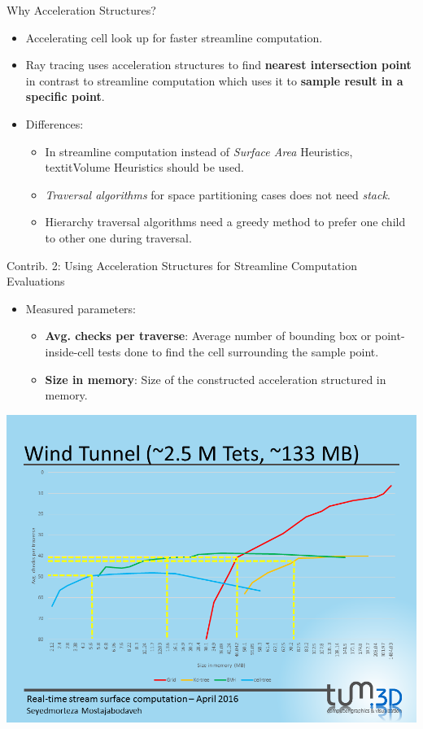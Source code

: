 \documentclass{beamer}
\begin{document}
\begin{frame}{Why Acceleration Structures?}
	\begin{itemize}
		\item Accelerating cell look up for faster streamline computation.
		\item Ray tracing uses acceleration structures to find \textbf{nearest intersection point} in contrast to streamline computation which uses it to \textbf{sample result in a specific point}.
		\item Differences:
		    \begin{itemize}
		    	\item In streamline computation instead of \textit{Surface Area} Heuristics, textit{Volume} Heuristics should be used.
		    	\item \textit{Traversal algorithms} for space partitioning cases does not need \textit{stack}.
		    	\item Hierarchy traversal algorithms need a greedy method to prefer one child to other one during traversal.
		    \end{itemize}
		
	\end{itemize}
\end{frame}

\begin{frame}{Contrib. 2: Using Acceleration Structures for Streamline Computation Evaluations}
	\begin{itemize}
		\item Measured parameters:
			 \begin{itemize}
			 	\item \textbf{Avg. checks per traverse}: Average number of bounding box or point-inside-cell tests done to find the cell surrounding the sample point.
			 	\item \textbf{Size in memory}: Size of the constructed acceleration structured in memory.
			 \end{itemize}
	\end{itemize}
\end{frame}

\begin{frame}{}
	\centering
	\includegraphics[height=\textheight]{figures/Slide23}
\end{frame}
\end{document}
